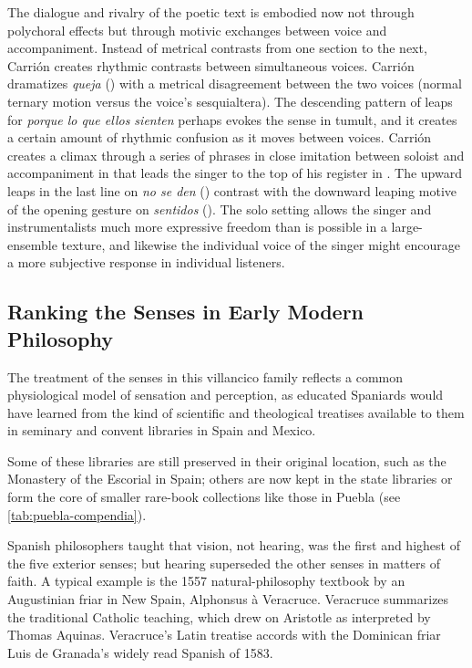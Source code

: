 The dialogue and rivalry of the poetic text is embodied now not through
polychoral effects but through motivic exchanges between voice and
accompaniment.
Instead of metrical contrasts from one section to the next, Carrión creates
rhythmic contrasts between simultaneous voices.
Carrión dramatizes \emph{queja} () with a metrical disagreement
between the two voices (normal ternary motion versus the voice's sesquialtera).
The descending pattern of leaps for \emph{porque lo que ellos sienten} perhaps
evokes the sense in tumult, and it creates a certain amount of rhythmic
confusion as it moves between voices.
Carrión creates a climax through a series of phrases in close imitation between
soloist and accompaniment in  that leads the singer to the top
of his register in .
The upward leaps in the last line on \emph{no se den} ()
contrast with the downward leaping motive of the opening gesture on
\emph{sentidos} ().
The solo setting allows the singer and instrumentalists much more expressive
freedom than is possible in a large-ensemble texture, and likewise the
individual voice of the singer might encourage a more subjective response in
individual listeners.


\subsection{Ranking the Senses in Early Modern Philosophy}

The treatment of the senses in this villancico family reflects a common
physiological model of sensation and perception, as educated Spaniards would
have learned from the kind of scientific and theological treatises available to
them in seminary and convent libraries in Spain and Mexico.%
\begin{Footnote}
    Some of these libraries are still preserved in their original location, such
    as the Monastery of the Escorial in Spain; others are now kept in the state
    libraries or form the core of smaller rare-book collections like those in
    Puebla (see \cref{tab:puebla-compendia}).
\end{Footnote}
Spanish philosophers taught that vision, not hearing, was the first and highest
of the five exterior senses; but hearing superseded the other senses in matters
of faith.
A typical example is the 1557 natural-philosophy textbook  by an Augustinian friar in New Spain, Alphonsus à Veracruce.%
    \Autocite{Veracruce:Phisica}
Veracruce summarizes the traditional Catholic teaching, which drew on Aristotle
as interpreted by Thomas Aquinas.
Veracruce's Latin treatise accords with the Dominican friar Luis de Granada's
widely read Spanish  of 1583.%
    \Autocites{LuisdeGranada:Simbolo}{LuisdeGranada-Balcells:SimboloPtI}

